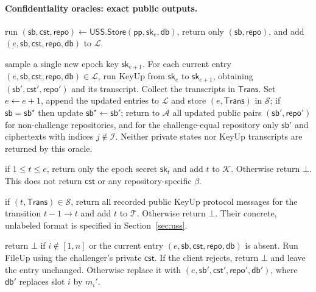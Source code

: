 \paragraph{Confidentiality oracles: exact public outputs.}
\begin{description}[leftmargin=1.4em,style=nextline]
  \item[$\mathcal{O}.\mathsf{Store}(\mathsf{db})$]
    run $(\mathsf{sb},\mathsf{cst},\mathsf{repo})\gets\mathsf{USS.Store}(\mathsf{pp},\mathsf{sk}_e,\mathsf{db})$, return only $(\mathsf{sb},\mathsf{repo})$, and add $(e,\mathsf{sb},\mathsf{cst},\mathsf{repo},\mathsf{db})$ to $\mathcal{L}$.
  \item[$\mathcal{O}.\mathsf{Next}$]
    sample a single new epoch key $\mathsf{sk}_{e+1}$. For each current entry $(e,\mathsf{sb},\mathsf{cst},\mathsf{repo},\mathsf{db})\in\mathcal{L}$, run KeyUp from $\mathsf{sk}_e$ to $\mathsf{sk}_{e+1}$, obtaining $(\mathsf{sb}',\mathsf{cst}',\mathsf{repo}')$ and its transcript. Collect the transcripts in $\mathsf{Trans}$.
    Set $e\leftarrow e+1$, append the updated entries to $\mathcal{L}$ and store $(e,\mathsf{Trans})$ in $\mathcal{S}$;
    if $\mathsf{sb}=\mathsf{sb}^\star$ then update $\mathsf{sb}^\star\leftarrow\mathsf{sb}'$;
    return to $\mathcal{A}$ all updated public pairs $(\mathsf{sb}',\mathsf{repo}')$ for non-challenge repositories, and for the challenge-equal repository only $\mathsf{sb}'$ and ciphertexts with indices $j\notin\mathcal{I}$. Neither private states nor KeyUp transcripts are returned by this oracle.
  \item[$\mathcal{O}.\mathsf{KeyCorr}(t)$]
    if $1\le t\le e$, return only the epoch secret $\mathsf{sk}_t$ and add $t$ to $\mathcal{K}$. Otherwise return $\bot$. This does not return $\mathsf{cst}$ or any repository-specific $\beta$.
  \item[$\mathcal{O}.\mathsf{KeyUpTrans}(t)$]
    if $(t,\mathsf{Trans})\in\mathcal S$, return all recorded public KeyUp protocol messages for the transition $t-1\to t$ and add $t$ to $\mathcal{T}$. Otherwise return $\bot$. Their concrete, unlabeled format is specified in Section~\ref{sec:uss}.
  \item[$\mathcal{O}.\mathsf{FileUp}(\mathsf{sb},m'_i,i)$]
    return $\bot$ if $i\notin[1,n]$ or the current entry $(e,\mathsf{sb},\mathsf{cst},\mathsf{repo},\mathsf{db})$ is absent. Run FileUp using the challenger's private $\mathsf{cst}$. If the client rejects, return $\bot$ and leave the entry unchanged. Otherwise replace it with $(e,\mathsf{sb}',\mathsf{cst}',\mathsf{repo}',\mathsf{db}')$, where $\mathsf{db}'$ replaces slot $i$ by $m_i'$.

\end{description}
